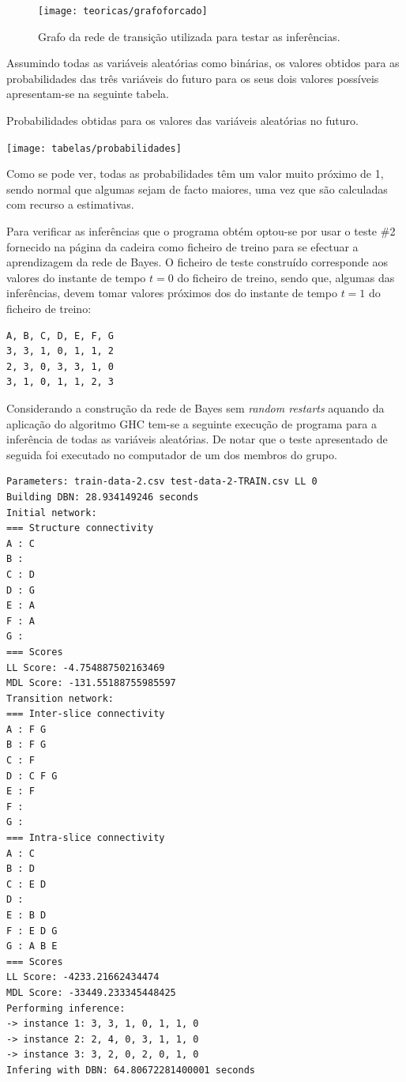 \documentclass[10pt]{article}
\numberwithin{equation}{section}
\begin{document}
\begin{figure}[H]
	\centering
	\texttt{[image: teoricas/grafoforcado]}
	\caption{Grafo da rede de transição utilizada para testar as inferências.}
	\vspace{-0.8em}
	\label{fig:grafoforcado}
\end{figure}

Assumindo todas as variáveis aleatórias como binárias, os valores obtidos para as probabilidades das três variáveis do futuro para os seus dois valores possíveis apresentam-se na seguinte tabela.

\begin{table}[H]
	\centering
	\caption{Probabilidades obtidas para os valores das variáveis aleatórias no futuro.}
	\vspace{-1.5mm}
	\texttt{[image: tabelas/probabilidades]}
\end{table}

\vspace{-1.5mm}
Como se pode ver, todas as probabilidades têm um valor muito próximo de 1, sendo normal que algumas sejam de facto maiores, uma vez que são calculadas com recurso a estimativas.

Para verificar as inferências que o programa obtém optou-se por usar o teste \#2 fornecido na página da cadeira como ficheiro de treino para se efectuar a aprendizagem da rede de Bayes. O ficheiro de teste construído corresponde aos valores do instante de tempo $t = 0$ do ficheiro de treino, sendo que, algumas das inferências, devem tomar valores próximos dos do instante de tempo $t = 1$ do ficheiro de treino:

\begin{lstlisting}
A, B, C, D, E, F, G
3, 3, 1, 0, 1, 1, 2
2, 3, 0, 3, 3, 1, 0
3, 1, 0, 1, 1, 2, 3
\end{lstlisting}

Considerando a construção da rede de Bayes sem \textit{random restarts} aquando da aplicação do algoritmo GHC tem-se a seguinte execução de programa para a inferência de todas as variáveis aleatórias. De notar que o teste apresentado de seguida foi executado no computador de um dos membros do grupo.

\begin{lstlisting}
Parameters: train-data-2.csv test-data-2-TRAIN.csv LL 0
Building DBN: 28.934149246 seconds
Initial network:
=== Structure connectivity
A : C
B :
C : D
D : G
E : A
F : A
G :
=== Scores
LL Score: -4.754887502163469
MDL Score: -131.55188755985597
Transition network:
=== Inter-slice connectivity
A : F G
B : F G
C : F
D : C F G
E : F
F :
G :
=== Intra-slice connectivity
A : C
B : D
C : E D
D :
E : B D
F : E D G
G : A B E
=== Scores
LL Score: -4233.21662434474
MDL Score: -33449.233345448425
Performing inference:
-> instance 1: 3, 3, 1, 0, 1, 1, 0
-> instance 2: 2, 4, 0, 3, 1, 1, 0
-> instance 3: 3, 2, 0, 2, 0, 1, 0
Infering with DBN: 64.80672281400001 seconds
\end{lstlisting}
\end{document}
